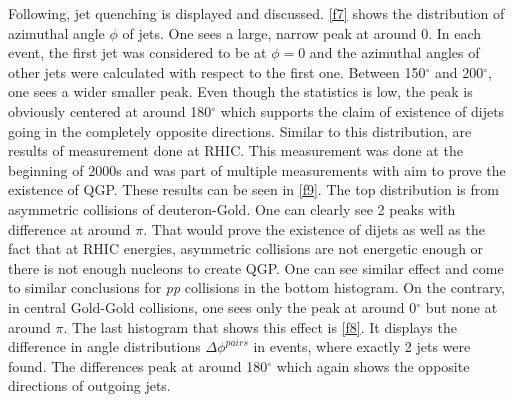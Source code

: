 \documentclass[a4paper,10pt]{article}
\begin{document}
\noindent Following, jet quenching is displayed and discussed. \autoref{f7} shows the distribution of azimuthal angle $\phi$ of jets. One sees a large, narrow peak at around 0. In each event, the first jet was considered to be at $\phi = 0$ and the azimuthal angles of other jets were calculated with respect to the first one. Between 150$^{\circ}$ and 200$^{\circ}$, one sees a wider smaller peak. Even though the statistics is low, the peak is obviously centered at around 180$^{\circ}$ which supports the claim of existence of dijets going in the completely opposite directions. Similar to this distribution, are results of measurement done at RHIC. This measurement was done at the beginning of 2000s and was part of multiple measurements with aim to prove the existence of QGP. These results can be seen in \autoref{f9}. The top distribution is from asymmetric collisions of deuteron-Gold. One can clearly see 2 peaks with difference at around $\pi$. That would prove the existence of dijets as well as the fact that at RHIC energies, asymmetric collisions are not energetic enough or there is not enough nucleons to create QGP. One can see similar effect and come to similar conclusions for \textit{pp} collisions in the bottom histogram. On the contrary, in central Gold-Gold collisions, one sees only the peak at around 0$^{\circ}$ but none at around $\pi$. The last histogram that shows this effect is \autoref{f8}. It displays the difference in angle distributions $\Delta\phi^{pairs}$ in events, where exactly 2 jets were found. The differences peak at around 180$^{\circ}$ which again shows the opposite directions of outgoing jets. 
\end{document}
